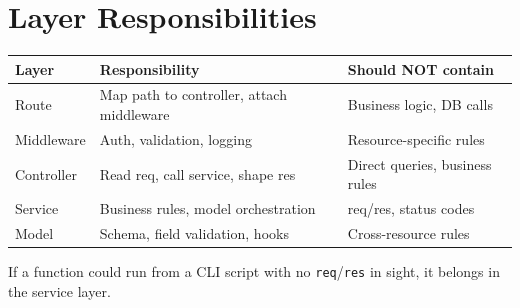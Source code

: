 \section{Layer Responsibilities}

\begin{table}[h]
\centering
\begin{tabularx}{\textwidth}{l X X}
\toprule
\textbf{Layer} & \textbf{Responsibility} & \textbf{Should NOT contain} \\
\midrule
Route       & Map path to controller, attach middleware & Business logic, DB calls \\
Middleware  & Auth, validation, logging & Resource-specific rules \\
Controller  & Read req, call service, shape res & Direct queries, business rules \\
Service     & Business rules, model orchestration & req/res, status codes \\
Model       & Schema, field validation, hooks & Cross-resource rules \\
\bottomrule
\end{tabularx}
\end{table}

\begin{tipbox}[TIP]
If a function could run from a CLI script with no \texttt{req}/\texttt{res} in sight, it belongs in the service layer.
\end{tipbox}
